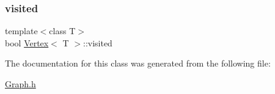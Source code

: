\mbox{\label{class_vertex_a187a2fe4ff50261cf3c15b8cda7dfc56}} 
\subsubsection{\texorpdfstring{visited}{visited}}
{\footnotesize\ttfamily template$<$class T$>$ \\
bool \hyperlink{class_vertex}{Vertex}$<$ T $>$\+::visited\hspace{0.3cm}{\ttfamily [private]}}



The documentation for this class was generated from the following file\+:\begin{DoxyCompactItemize}
\item 
\hyperlink{_graph_8h}{Graph.\+h}\end{DoxyCompactItemize}
